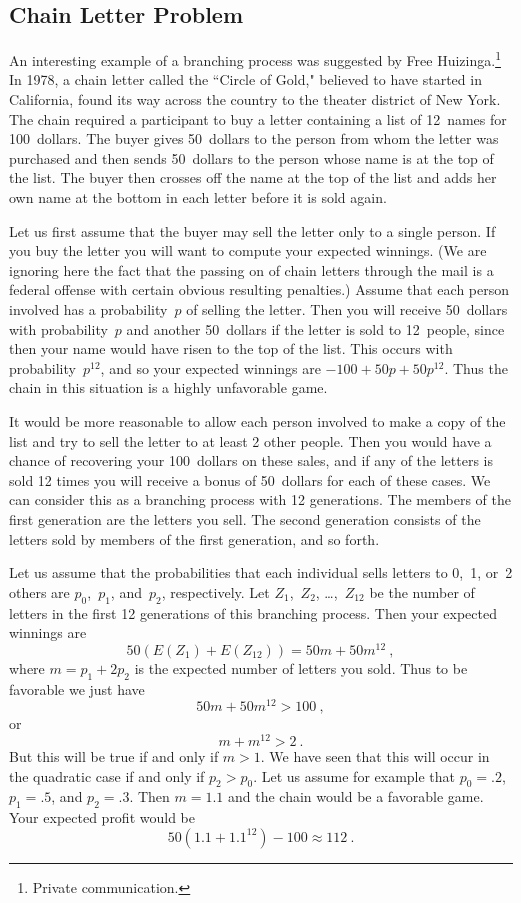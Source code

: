 \subsection*{Chain Letter Problem}
\begin{example}\label{exam 10.2.5}
An interesting example of a branching process was suggested by Free
Huizinga.\footnote{Private communication.}  In 1978, a chain
letter called the ``Circle of Gold," believed to have
started in California,  found its way across the country to the theater district of New
York.  The chain required a participant to buy a letter containing a list of 12~names for
100~dollars.  The buyer gives 50~dollars to the person from whom the letter was purchased and
then sends 50~dollars to the person whose name is at the top of the list.  The
buyer then crosses off the name at the top of the list and adds her own name at
the bottom in each letter before it is sold again.

Let us first assume that the buyer may sell the letter only to a single
person.  If you buy the letter you will want to compute your expected
winnings.  (We are ignoring here the fact that the passing on of chain letters
through the mail is a federal offense with certain obvious resulting
penalties.)  Assume that each person involved has a probability~$p$ of selling
the letter.  Then you will receive 50~dollars with probability~$p$ and another
50~dollars if the letter is sold to 12~people, since then your name would have
risen to the top of the list.  This occurs with probability~$p^{12}$, and so
your expected winnings are $-100 + 50p + 50p^{12}$.  Thus the chain in this
situation is a highly unfavorable game.

It would be more reasonable to allow each person involved to make a copy of the
list and try to sell the letter to at least 2 other people.  Then you would
have a chance of recovering your 100~dollars on these sales, and if any of the
letters is sold 12 times you will receive a bonus of 50~dollars for each of
these cases.  We can consider this as a branching process with 12 generations. 
The members of the first generation are the letters you sell.  The second
generation consists of the letters sold by members of the first generation, and
so forth.

Let us assume that the probabilities that each individual sells letters to
0,~1, or~2 others are $p_0$,~$p_1$, and~$p_2$, respectively.  Let $Z_1$,~$Z_2$,
\ldots,~$Z_{12}$ be the number of letters in the first 12 generations of this
branching process.  Then your expected winnings are
$$
50(E(Z_1) + E(Z_{12})) = 50m + 50m^{12}\ ,
$$
where $m = p_1 + 2p_2$ is the expected number of letters you sold.  Thus to be
favorable we just have
$$
50m + 50m^{12} > 100\ ,
$$
or
$$
m + m^{12} > 2\ .
$$
But this will be true if and only if $m > 1$.  We have seen that this will
occur in the quadratic case if and only if $p_2 > p_0$.  Let us assume for
example that $p_0 = .2$, $p_1 = .5$, and $p_2 = .3$.  Then $m = 1.1$ and the
chain would be a favorable game.  Your expected profit would be
$$
50(1.1 + 1.1^{12}) - 100 \approx 112\ .
$$


\end{example}
